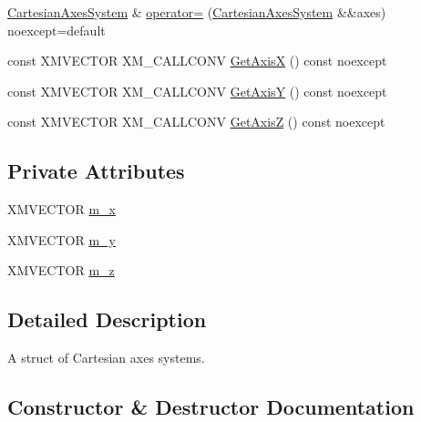 \begin{DoxyCompactItemize}
\item 
\hyperlink{structmage_1_1_cartesian_axes_system}{Cartesian\+Axes\+System} \& \hyperlink{structmage_1_1_cartesian_axes_system_ac46d36a50bc7a310cf79beca834f44c6}{operator=} (\hyperlink{structmage_1_1_cartesian_axes_system}{Cartesian\+Axes\+System} \&\&axes) noexcept=default
\item 
const X\+M\+V\+E\+C\+T\+OR X\+M\+\_\+\+C\+A\+L\+L\+C\+O\+NV \hyperlink{structmage_1_1_cartesian_axes_system_ac875736787757e685c166db671cc91f6}{Get\+AxisX} () const noexcept
\item 
const X\+M\+V\+E\+C\+T\+OR X\+M\+\_\+\+C\+A\+L\+L\+C\+O\+NV \hyperlink{structmage_1_1_cartesian_axes_system_a690afbdf71c3052cc6da11b6c841702b}{Get\+AxisY} () const noexcept
\item 
const X\+M\+V\+E\+C\+T\+OR X\+M\+\_\+\+C\+A\+L\+L\+C\+O\+NV \hyperlink{structmage_1_1_cartesian_axes_system_a13567d3342de7609c0bdf18e8596b96f}{Get\+AxisZ} () const noexcept
\end{DoxyCompactItemize}
\subsection*{Private Attributes}
\begin{DoxyCompactItemize}
\item 
X\+M\+V\+E\+C\+T\+OR \hyperlink{structmage_1_1_cartesian_axes_system_aa840c10ca92782e8c87c1ab53f0b86e9}{m\+\_\+x}
\item 
X\+M\+V\+E\+C\+T\+OR \hyperlink{structmage_1_1_cartesian_axes_system_a2cc6bc4fe185791a877e1418e85d6b47}{m\+\_\+y}
\item 
X\+M\+V\+E\+C\+T\+OR \hyperlink{structmage_1_1_cartesian_axes_system_abc733e5f82104391b0b352d263313d64}{m\+\_\+z}
\end{DoxyCompactItemize}


\subsection{Detailed Description}
A struct of Cartesian axes systems. 

\subsection{Constructor \& Destructor Documentation}
\hypertarget{structmage_1_1_cartesian_axes_system_add0a80b4448a5fd943ac2da001df29d6}{}\label{structmage_1_1_cartesian_axes_system_add0a80b4448a5fd943ac2da001df29d6} 
